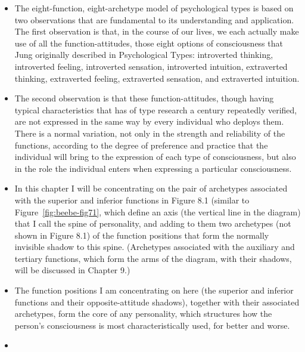 \begin{itemize}

\item

The eight-function, eight-archetype model of psychological types is based on
two observations that are fundamental to its understanding and application. The
first observation is that, in the course of our lives, we each actually make
use of all the function-attitudes, those eight options of consciousness that
Jung originally described in Psychological Types: introverted thinking,
introverted feeling, introverted sensation, introverted intuition, extraverted
thinking, extraverted feeling, extraverted sensation, and extraverted
intuition.

\item

The second observation is that these function-attitudes, though having typical
characteristics that has of type research a century repeatedly verified, are
not expressed in the same way by every individual who deploys them. There is a
normal variation, not only in the strength and reliability of the functions,
according to the degree of preference and practice that the individual will
bring to the expression of each type of consciousness, but also in the role the
individual enters when expressing a particular consciousness.

\item

In this chapter I will be concentrating on the pair of archetypes associated
with the superior and inferior functions in Figure 8.1 (similar to
Figure~\ref{fig:beebe-fig71}, which define an axis (the vertical line in the
diagram) that I call the spine of personality, and adding to them two
archetypes (not shown in Figure 8.1) of the function positions that form the
normally invisible shadow to this spine. (Archetypes associated with the
auxiliary and tertiary functions, which form the arms of the diagram, with
their shadows, will be discussed in Chapter 9.)

\item

The function positions I am concentrating on here (the superior and inferior
functions and their opposite-attitude shadows), together with their associated
archetypes, form the core of any personality, which structures how the person’s
consciousness is most characteristically used, for better and worse.

\item


\end{itemize}

